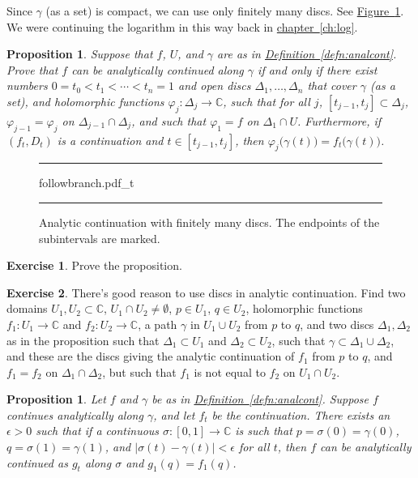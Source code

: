 \documentclass[12pt,openany]{book}
\newcommand{\sabs}[1]{\lvert {#1} \rvert}
\newcommand{\C}{{\mathbb{C}}}
\theoremstyle{plain}
\newtheorem{prop}[thm]{Proposition}
\theoremstyle{remark}
\theoremstyle{definition}
\newenvironment{exbox}{%
    \def\FrameCommand{\vrule width 1pt \relax\hspace{10pt}}%
    \MakeFramed{\advance\hsize-\width\FrameRestore}%
}{%
    \endMakeFramed
}
\newenvironment{myfig}{%
\begin{figure}[h!t]
\noindent\rule{\textwidth}{0.5pt}\vspace{12pt}\par\centering}%
{\par\noindent\rule{\textwidth}{0.5pt}
\end{figure}}
\theoremstyle{exercise}
\newtheorem{exercise}{Exercise}[section]
\theoremstyle{example}
\newcommand{\figureref}[1]{\hyperref[#1]{Figure~\ref*{#1}}}
\newcommand{\chapterref}[1]{\hyperref[#1]{chapter~\ref*{#1}}}
\newcommand{\defnref}[1]{\hyperref[#1]{Definition~\ref*{#1}}}
\begin{document}
Since $\gamma$ (as a set) is compact, we can use only finitely many
discs.  See \figureref{fig:followbranch2}.
We were continuing the logarithm in this way back in
\chapterref{ch:log}.

\begin{prop} \label{prop:finitedisccont}
Suppose that $f$, $U$, and $\gamma$ are as in \defnref{defn:analcont}.
Prove that $f$ can be analytically continued along $\gamma$
if and only if there exist numbers $0 = t_0 < t_1 < \cdots < t_n = 1$
and open discs
$\Delta_1,\ldots,\Delta_n$ that cover $\gamma$ (as a set),
and holomorphic functions $\varphi_j \colon \Delta_j \to \C$,
such that for all $j$, $[t_{j-1},t_j] \subset \Delta_j$,
$\varphi_{j-1} = \varphi_j$ on $\Delta_{j-1} \cap \Delta_j$,
and such that $\varphi_1 = f$ on $\Delta_1 \cap U$.
Furthermore, if $(f_t,D_t)$ is a continuation and $t \in [t_{j-1},t_j]$,
then $\varphi_j\bigl(\gamma(t)\bigr) = f_t\bigl(\gamma(t)\bigr)$.
\end{prop}

\begin{myfig}
{followbranch.pdf_t}
\caption{Analytic continuation with finitely many discs.  The endpoints of
the subintervals are marked.\label{fig:followbranch2}}
\end{myfig}

\begin{exbox}
\begin{exercise}
Prove the proposition.
\end{exercise}

\begin{exercise}
There's good reason to use discs in analytic continuation.  Find two domains
$U_1, U_2 \subset \C$, $U_1 \cap U_2 \not= \emptyset$,
$p \in U_1$, $q \in U_2$, holomorphic functions
$f_1 \colon U_1 \to \C$ and $f_2 \colon U_2 \to \C$,
a path $\gamma$ in $U_1 \cup U_2$ from $p$ to $q$, and two discs $\Delta_1,\Delta_2$
as in the proposition such that $\Delta_1 \subset U_1$ and $\Delta_2 \subset
U_2$, such that $\gamma \subset \Delta_1 \cup \Delta_2$, and these are the
discs giving the analytic continuation of $f_1$ from $p$ to $q$, and $f_1 =
f_2$ on $\Delta_1 \cap \Delta_2$, but such that $f_1$ is not equal to $f_2$
on $U_1 \cap U_2$.
\end{exercise}
\end{exbox}

\begin{prop} \label{prop:continuationclose}
Let $f$ and $\gamma$ be as in \defnref{defn:analcont}.
Suppose $f$ continues analytically along $\gamma$, and let
$f_t$ be the continuation.
There exists an $\epsilon > 0$ such that if
a continuous
$\sigma \colon [0,1] \to \C$ is such that $p=\sigma(0)=\gamma(0)$,
$q=\sigma(1)=\gamma(1)$, and
$\sabs{\sigma(t)-\gamma(t)} < \epsilon$ for all $t$,
then
$f$ can be analytically continued as $g_t$ along $\sigma$ and
$g_1(q)=f_1(q)$.
\end{prop}
\end{document}
